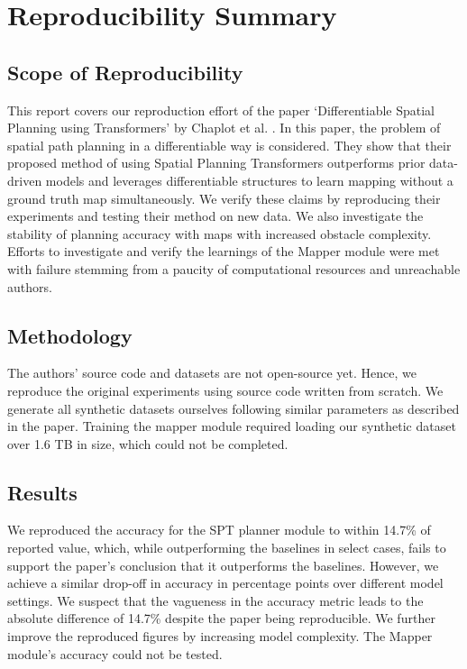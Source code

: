 \section*{\centering Reproducibility Summary}

\subsection*{Scope of Reproducibility}

This report covers our reproduction effort of the paper `Differentiable Spatial Planning using Transformers' by Chaplot et al. \cite{chaplot2021differentiable}. In this paper, the problem of spatial path planning in a differentiable way is considered. They show that their proposed method of using Spatial Planning Transformers outperforms prior data-driven models and leverages differentiable structures to learn mapping without a ground truth map simultaneously. We verify these claims by reproducing their experiments and testing their method on new data. We also investigate the stability of planning accuracy with maps with increased obstacle complexity. Efforts to investigate and verify the learnings of the Mapper module were met with failure stemming from a paucity of computational resources and unreachable authors.

\subsection*{Methodology}

The authors' source code and datasets are not open-source yet. Hence, we reproduce the original experiments using source code written from scratch. We generate all synthetic datasets ourselves following similar parameters as described in the paper. Training the mapper module required loading our synthetic dataset over 1.6 TB in size, which could not be completed.

\subsection*{Results}

We reproduced the accuracy for the SPT planner module to within 14.7\% of reported value, which, while outperforming the baselines \cite{lee2018gated} \cite{tamar2016value} in select cases, fails to support the paper's conclusion that it outperforms the baselines. However, we achieve a similar drop-off in accuracy in percentage points over different model settings. We suspect that the vagueness in the accuracy metric leads to the absolute difference of 14.7\% despite the paper being reproducible. We further improve the reproduced figures by increasing model complexity. The Mapper module's accuracy could not be tested.

